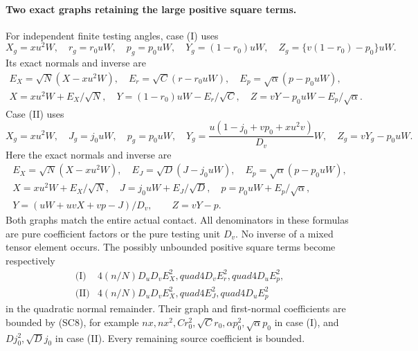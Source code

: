 \paragraph{Two exact graphs retaining the large positive square terms.}
For independent finite testing angles, case (I) uses
\[
 X_g=xu^2W,\quad r_g=r_0uW,\quad p_g=p_0uW,
 \quad Y_g=(1-r_0)uW,\quad Z_g=\{v(1-r_0)-p_0\}uW.    \tag{SC9}
\]
Its exact normals and inverse are
\[
\begin{gathered}
 E_X=\sqrt N(X-xu^2W),\quad E_r=\sqrt C(r-r_0uW),
 \quad E_p=\sqrt\alpha(p-p_0uW),\\
 X=xu^2W+E_X/\sqrt N,\quad
 Y=(1-r_0)uW-E_r/\sqrt C,\quad
 Z=vY-p_0uW-E_p/\sqrt\alpha.                         
\end{gathered}
\tag{SC10}
\]
Case (II) uses
\[
 X_g=xu^2W,\quad J_g=j_0uW,\quad p_g=p_0uW,
 \quad Y_g=\frac{u(1-j_0+vp_0+xu^2v)}{D_v}W,
 \quad Z_g=vY_g-p_0uW.                              \tag{SC11}
\]
Here the exact normals and inverse are
\[
\begin{gathered}
 E_X=\sqrt N(X-xu^2W),\quad E_J=\sqrt D(J-j_0uW),
 \quad E_p=\sqrt\alpha(p-p_0uW),\\
 X=xu^2W+E_X/\sqrt N,\quad J=j_0uW+E_J/\sqrt D,
 \quad p=p_0uW+E_p/\sqrt\alpha,\\
 Y=(uW+uvX+vp-J)/D_v,\qquad Z=vY-p.                 
\end{gathered}
\tag{SC12}
\]
Both graphs match the entire actual contact. All denominators in
these formulas are pure coefficient factors or the pure testing
unit $D_v$. No inverse of a mixed tensor element occurs.
The possibly unbounded positive square terms become respectively
\[
\begin{array}{ll}
 \text{(I)}&4(n/N)D_uD_vE_X^2,quad4D_vE_r^2,quad4D_uE_p^2,\\
 \text{(II)}&4(n/N)D_uD_vE_X^2,quad4E_J^2,quad4D_uE_p^2
\end{array}
\]
in the quadratic normal remainder. Their graph and first-normal
coefficients are bounded by (SC8), for example
$nx,nx^2,Cr_0^2,\sqrt C r_0,\alpha p_0^2,\sqrt\alpha p_0$
in case (I), and $Dj_0^2,\sqrt D j_0$ in case (II).
Every remaining source coefficient is bounded.

